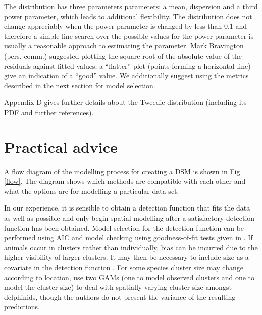 \documentclass[a4paper,12pt]{article}
\begin{document}
The distribution has three parameters parameters: a mean, dispersion and a third power parameter, which leads to additional flexibility. The distribution does not change appreciably when the power parameter is changed by less than $0.1$ and therefore a simple line search over the possible values for the power parameter is usually a reasonable approach to estimating the parameter. Mark Bravington (pers. comm.) suggested plotting the square root of the absolute value of the residuals against fitted values; a ``flatter'' plot (points forming a horizontal line) give an indication of a ``good'' value. We additionally suggest using the metrics described in the next section for model selection.

Appendix D gives further details about the Tweedie distribution (including its PDF and further references).

\section*{Practical advice}
\label{s:practical}

A flow diagram of the modelling process for creating a DSM is shown in Fig. \ref{flow}. The diagram shows which methods are compatible with each other and what the options are for modelling a particular data set.

In our experience, it is sensible to obtain a detection function that fits the data as well as possible and only begin spatial modelling after a satisfactory detection function has been obtained. Model selection for the detection function can be performed using AIC and model checking using goodness-of-fit tests given in \citet[Section 11.11]{burnham:2004vd}.  If animals occur in clusters rather than individually, bias can be incurred due to the higher visibility of larger clusters. It may then be necessary to include size as a covariate in the detection function \citep[see][Section 4.8.2.4]{Buckland:2001vm}. For some species cluster size may change according to location, \cite{Ferguson:2006ex} use two GAMs (one to model observed clusters and one to model the cluster size) to deal with spatially-varying cluster size amongst delphinids, though the authors do not present the variance of the resulting predictions.
\end{document}
